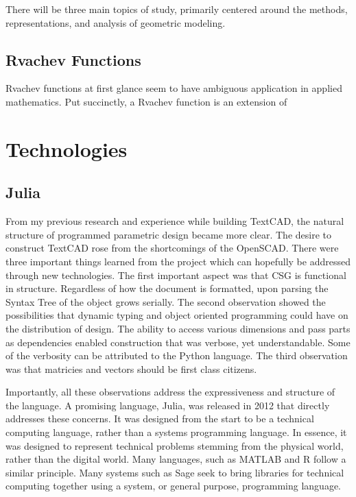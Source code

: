 \documentclass[a4paper]{article}
\begin{document}
There will be three main topics of study, primarily centered around the methods, representations, and analysis of geometric modeling.


\subsection{Rvachev Functions}
Rvachev functions at first glance seem to have ambiguous application in applied mathematics. Put succinctly, a Rvachev function is an extension of \cite{shapiro2007semi}

\cite{shapiro1991theory}

\cite{pasko1995function}

\section{Technologies}
\subsection{Julia}
From my previous research and experience while building TextCAD, the natural structure of programmed parametric design became more clear. The desire to construct TextCAD rose from the shortcomings of the OpenSCAD. There were three important things learned from the project which can hopefully be addressed through new technologies. The first important aspect was that CSG is functional in structure. Regardless of how the document is formatted, upon parsing the Syntax Tree of the object grows serially. The second observation showed the possibilities that dynamic typing and object oriented programming could have on the distribution of design. The ability to access various dimensions and pass parts as dependencies enabled construction that was verbose, yet understandable. Some of the verbosity can be attributed to the Python language. The third observation was that matricies and vectors should be first class citizens.

Importantly, all these observations address the expressiveness and structure of the language. A promising language, Julia, was released in 2012 that directly addresses these concerns. It was designed from the start to be a technical computing language, rather than a systems programming language.\cite{bezanson2012julia} In essence, it was designed to represent technical problems stemming from the physical world, rather than the digital world. Many languages, such as MATLAB and R follow a similar principle. Many systems such as Sage seek to bring libraries for technical computing together using a system, or general purpose, programming language. 
\end{document}
